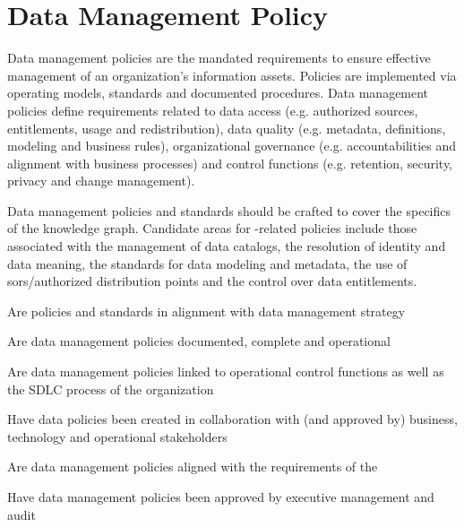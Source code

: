 \section{Data Management Policy}\label{sec:ekgmm-b-4-2} %

Data management policies are the mandated requirements to ensure effective management of an organization’s
information assets.
Policies are implemented via operating models, standards and documented procedures.
Data management policies define requirements related to data access (e.g. authorized sources, entitlements,
usage and redistribution), data quality (e.g. metadata, definitions, modeling and business rules),
organizational governance (e.g. accountabilities and alignment with business processes) and
control functions (e.g. retention, security, privacy and change management).

\ekgmmContextSection

Data management policies and standards should be crafted to cover the specifics of the knowledge graph.
Candidate areas for -related policies include those associated with the management of data catalogs,
the resolution of identity and data meaning, the standards for data modeling and metadata,
the use of \glspl{sor}/authorized distribution points and the control over data entitlements.

\kgmmcorequestionssection

\begin{core-questions}

  \item [\thesection.1] Are policies and standards in alignment with data management strategy
  \item [\thesection.2] Are data management policies documented, complete and operational
  \item [\thesection.3] Are data management policies linked to operational control functions as well as the
                        SDLC process of the organization
  \item [\thesection.4] Have data policies been created in collaboration with (and approved by) business, technology
                        and operational stakeholders
  \item [\thesection.5] Are data management policies aligned with the requirements of the 
  \item [\thesection.6] Have data management policies been approved by executive management and audit

\end{core-questions}

